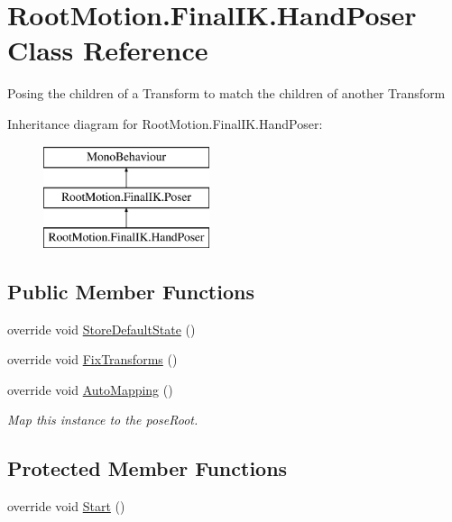 \hypertarget{class_root_motion_1_1_final_i_k_1_1_hand_poser}{}\section{Root\+Motion.\+Final\+I\+K.\+Hand\+Poser Class Reference}
\label{class_root_motion_1_1_final_i_k_1_1_hand_poser}


Posing the children of a Transform to match the children of another Transform  


Inheritance diagram for Root\+Motion.\+Final\+I\+K.\+Hand\+Poser\+:\begin{figure}[H]
\begin{center}
\leavevmode
\includegraphics[height=3.000000cm]{class_root_motion_1_1_final_i_k_1_1_hand_poser}
\end{center}
\end{figure}
\subsection*{Public Member Functions}
\begin{DoxyCompactItemize}
\item 
override void \mbox{\hyperlink{class_root_motion_1_1_final_i_k_1_1_hand_poser_a6da6c87d2f7d0eb7d3c3fb37da066ef8}{Store\+Default\+State}} ()
\item 
override void \mbox{\hyperlink{class_root_motion_1_1_final_i_k_1_1_hand_poser_af5d88be3e8ab503e82e27be0838dc586}{Fix\+Transforms}} ()
\item 
override void \mbox{\hyperlink{class_root_motion_1_1_final_i_k_1_1_hand_poser_a9e414a816ca5c67281de9160f250e408}{Auto\+Mapping}} ()
\begin{DoxyCompactList}\small\item\em Map this instance to the pose\+Root. \end{DoxyCompactList}\end{DoxyCompactItemize}
\subsection*{Protected Member Functions}
\begin{DoxyCompactItemize}
\item 
override void \mbox{\hyperlink{class_root_motion_1_1_final_i_k_1_1_hand_poser_a99f98f5003f3cdedba368fafd6168234}{Start}} ()
\end{DoxyCompactItemize}
